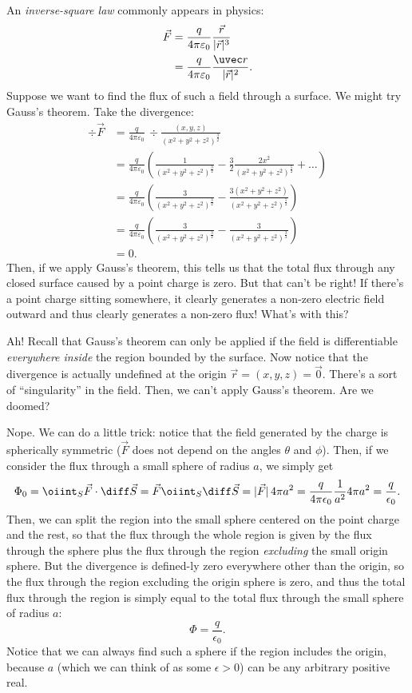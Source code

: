 \documentclass{multi}
\begin{document}
An \emph{inverse-square law} commonly appears in physics:
\begin{align*}
  \vec F &= \frac{q}{4 \pi \varepsilon_0} \frac{\vec r}{|\vec r|^3} \\
  &= \frac{q}{4 \pi \varepsilon_0} \frac{\uvec r}{|\vec r|^2}.
\end{align*}
Suppose we want to find the flux of such a field through a surface.  We might
try Gauss's theorem. Take the divergence:
\begin{align*}
  \div \vec F &= \frac{q}{4 \pi \varepsilon_0} \, \div \frac{(x, y,
    z)}{(x^2 + y^2 + z^2)^{\frac 3 2}} \\
  &= \frac{q}{4\pi \varepsilon_0} \left(\frac{1}{(x^2+y^2+z^2)^{\frac 3 2}} - \frac 3 2 \frac{2x^2}{(x^2+y^2+z^2)^{\frac 5 2}} + \dots\right) \\
  &= \frac{q}{4\pi \varepsilon_0} \left(\frac{3}{(x^2+y^2+z^2)^{\frac 3 2}} - \frac{3(x^2+y^2+z^2)}{(x^2+y^2+z^2)^{\frac 5 2}}\right) \\
  &= \frac{q}{4\pi \varepsilon_0} \left(\frac{3}{(x^2+y^2+z^2)^{\frac 3 2}} - \frac{3}{(x^2+y^2+z^2)^{\frac 3 2}}\right) \\
  &= 0.
\end{align*}
Then, if we apply Gauss's theorem, this tells us that the total flux through any
closed surface caused by a point charge is zero. But that can't be right! If
there's a point charge sitting somewhere, it clearly generates a non-zero
electric field outward and thus clearly generates a non-zero flux! What's with
this?

Ah! Recall that Gauss's theorem can only be applied if the field is
differentiable \emph{everywhere inside} the region bounded by the surface.  Now
notice that the divergence is actually undefined at the origin \(\vec r = (x, y,
z) = \vec 0\).  There's a sort of ``singularity'' in the field.  Then, we can't
apply Gauss's theorem.  Are we doomed?

Nope.  We can do a little trick: notice that the field generated by the charge
is spherically symmetric (\(\vec F\) does not depend on the angles \(\theta\)
and \(\phi\)).  Then, if we consider the flux through a small sphere of radius
\(a\), we simply get
\begin{gather*}
  \Phi_0 = \oiint_S \vec F \cdot \diff \vec S = \vec F \oiint_S \diff \vec S =
  |\vec F| \, 4 \pi a^2 = \frac{q}{4 \pi \epsilon_0} \frac{1}{a^2} 4 \pi a^2 = \frac{q}{\epsilon_0}.
\end{gather*}
Then, we can split the region into the small sphere centered on the point charge
and the rest, so that the flux through the whole region is given by the flux
through the sphere plus the flux through the region \emph{excluding} the small
origin sphere.  But the divergence is defined-ly zero everywhere other than the
origin, so the flux through the region excluding the origin sphere is zero, and
thus the total flux through the region is simply equal to the total flux through
the small sphere of radius \(a\):
\[
\Phi = \frac{q}{\epsilon_0}.
\]
Notice that we can always find such a sphere if the region includes the origin,
because \(a\) (which we can think of as some \(\epsilon > 0\)) can be any
arbitrary positive real.
\end{document}
